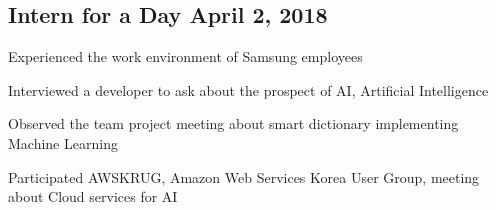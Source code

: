 \documentclass[letter,10pt]{article}
\begin{document}
\subsection{{Intern for a Day \hfill April 2, 2018}}
\begin{zitemize}
\item Experienced the work environment of Samsung employees
\item Interviewed a developer to ask about the prospect of AI, Artificial Intelligence
\item Observed the team project meeting about smart dictionary implementing Machine Learning
\item Participated AWSKRUG, Amazon Web Services Korea User Group, meeting about Cloud services for AI
\end{zitemize}
\end{document}
